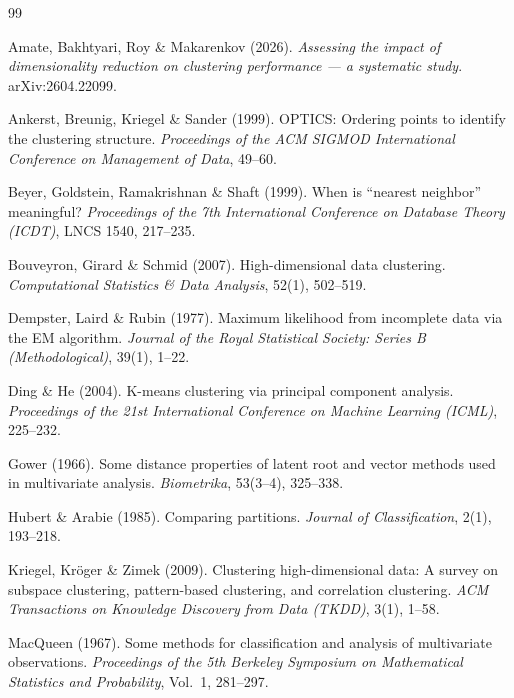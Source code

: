 \documentclass[12pt,a4paper]{report}
\begin{document}

\begin{thebibliography}{99}

Amate, Bakhtyari, Roy \& Makarenkov (2026).
\textit{Assessing the impact of dimensionality reduction on clustering
performance --- a systematic study}.
arXiv:2604.22099.

Ankerst, Breunig, Kriegel \& Sander (1999).
OPTICS: Ordering points to identify the clustering structure.
\textit{Proceedings of the ACM SIGMOD International Conference on Management
of Data}, 49--60.

Beyer, Goldstein, Ramakrishnan \& Shaft (1999).
When is ``nearest neighbor'' meaningful?
\textit{Proceedings of the 7th International Conference on Database
Theory (ICDT)}, LNCS 1540, 217--235.

Bouveyron, Girard \& Schmid (2007).
High-dimensional data clustering.
\textit{Computational Statistics \& Data Analysis}, 52(1), 502--519.

Dempster, Laird \& Rubin (1977).
Maximum likelihood from incomplete data via the EM algorithm.
\textit{Journal of the Royal Statistical Society: Series B (Methodological)},
39(1), 1--22.

Ding \& He (2004).
K-means clustering via principal component analysis.
\textit{Proceedings of the 21st International Conference on Machine
Learning (ICML)}, 225--232.

Gower (1966).
Some distance properties of latent root and vector methods used in
multivariate analysis.
\textit{Biometrika}, 53(3--4), 325--338.

Hubert \& Arabie (1985).
Comparing partitions.
\textit{Journal of Classification}, 2(1), 193--218.

Kriegel, Kröger \& Zimek (2009).
Clustering high-dimensional data: A survey on subspace clustering,
pattern-based clustering, and correlation clustering.
\textit{ACM Transactions on Knowledge Discovery from Data (TKDD)}, 3(1), 1--58.

MacQueen (1967).
Some methods for classification and analysis of multivariate observations.
\textit{Proceedings of the 5th Berkeley Symposium on Mathematical Statistics
and Probability}, Vol.~1, 281--297.


\end{thebibliography}
\end{document}
